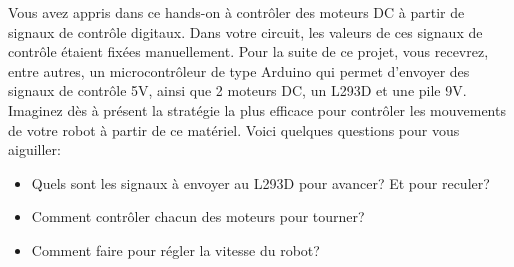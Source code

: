 Vous avez appris dans ce hands-on à contrôler des moteurs DC à partir de signaux de contrôle digitaux. Dans votre circuit, les valeurs de ces signaux de contrôle étaient fixées manuellement. Pour la suite de ce projet, vous recevrez, entre autres, un microcontrôleur de type Arduino qui permet d'envoyer des signaux de contrôle 5V, ainsi que 2 moteurs DC, un L293D et une pile 9V. Imaginez dès à présent la stratégie la plus efficace pour contrôler les mouvements de votre robot à partir de ce matériel. Voici quelques questions pour vous aiguiller:
\begin{itemize}
\item Quels sont les signaux à envoyer au L293D pour avancer? Et pour reculer?
\item Comment contrôler chacun des moteurs pour tourner?
\item Comment faire pour régler la vitesse du robot? 
\end{itemize}